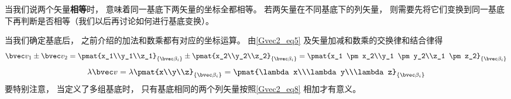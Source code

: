 当我们说两个矢量\textbf{相等}时， 意味着同一基底下两矢量的坐标全都相等。 若两矢量在不同基底下的列矢量， 则需要先将它们变换到同一基底下再判断是否相等（我们以后再讨论如何进行基底变换）。

当我们确定基底后， 之前介绍的加法和数乘都有对应的坐标运算。 由\autoref{Gvec2_eq5} 及矢量加减和数乘的交换律和结合律得
\begin{equation}\label{Gvec2_eq8}
\bvec v_1 \pm \bvec v_2 = \pmat{x_1\\y_1\\z_1}_{\{\bvec\beta_i\}} \pm \pmat{x_2\\y_2\\z_2}_{\{\bvec\beta_i\}} = \pmat{x_1 \pm x_2\\y_1 \pm y_2\\z_1 \pm z_2}_{\{\bvec\beta_i\}}
\end{equation}
\begin{equation}\label{Gvec2_eq9}
\lambda \bvec v = \lambda\pmat{x\\y\\z}_{\{\bvec\beta_i\}} = \pmat{\lambda x\\\lambda y\\\lambda z}_{\{\bvec\beta_i\}}
\end{equation}
要特别注意， 当定义了多组基底时， 只有基底相同的两个列矢量按照\autoref{Gvec2_eq8} 相加才有意义。
